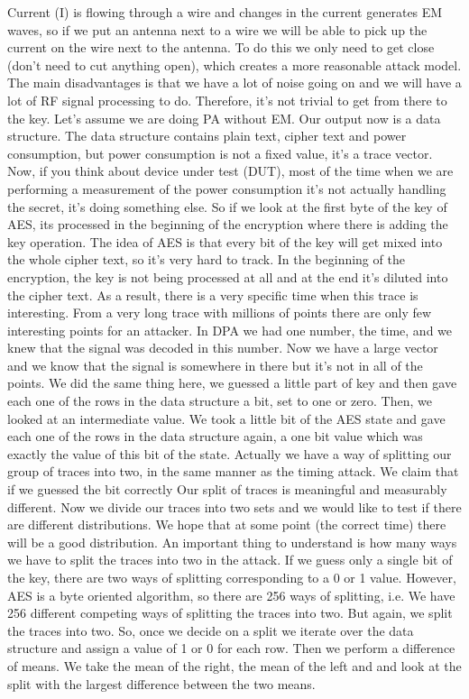 Current (I) is flowing through a wire and changes in the current generates EM
waves, so if we put an antenna next to a wire we will be able to pick up the
current on the wire next to the antenna. To do this we only need to get close (don't need to cut anything open), which creates a more reasonable attack
model. The main disadvantages is that we have a lot of noise going on and we will
have a lot of RF signal processing to do. Therefore, it's not trivial to get from there
to the key. Let's assume we are doing PA without EM. Our output now is a data structure. The data structure contains plain text, cipher text and power
consumption, but power consumption is not a fixed value, it's a trace vector.
Now, if you think about device under test (DUT), most of the time when we are
performing a measurement of the power consumption it's not actually handling the
secret, it's doing something else. So if we look at the first byte of the key of
AES, its processed in the beginning of the encryption where there is adding the
key operation. The idea of AES is that every bit of the key will get mixed into
the whole cipher text, so it's very hard to track. In the beginning of
the encryption, the key is not being processed at all and at the end it's diluted into the cipher text. As a result, there is a very specific time when
this trace is interesting. From a very long trace with millions of points there
are only few interesting points for an attacker. In DPA we had one number, the
time, and we knew that the signal was decoded in this number. Now we have a large
vector and we know that the signal is somewhere in there but it's not in all of the
points. We did the same thing here, we guessed a little part of key and then gave each one of the rows in the data structure a bit, set to one or zero. Then, we
looked at an intermediate value. We took a little bit of the AES state and gave each one of the rows in the data structure again, a one bit value which was exactly the value of this bit of the state. Actually we have a way of splitting our group of traces into two,
in the same manner as the timing attack. We claim that if we guessed the bit correctly Our split of traces is meaningful and measurably different. Now we divide our traces into two sets and we would like to test if there are different distributions. We hope that at
some point (the correct time) there will be a good distribution. An important
thing to understand is how many ways we have to split the traces into two in the attack. If we guess only a single bit of the key, there are two ways of splitting corresponding to a 0 or 1 value.
However, AES is a byte oriented algorithm, so there are 256 ways of splitting, i.e. We have 256
different competing ways of splitting the traces into two. But again, we split
the traces into two. So, once we decide on a split we iterate over the data structure
and assign a value of 1 or 0 for each row. Then we perform a difference of means. We take the mean of the right, the mean of the left and and look at the split with the largest difference between the two means. 

